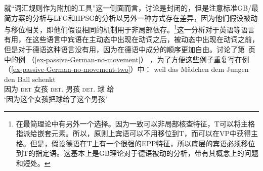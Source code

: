 就“词汇规则作为附加的工具”这一侧面而言，讨论是封闭的，但是注意标准GB/最简方案的分析与LFG和HPSG的分析以另外一种方式存在差异，因为他们假设被动与移位相关，即他们假设相同的机制用于非局部依存。\footnote{%
在最简理论中有另外一个选择。因为一致可以非局部核查特征，T可以将主格指派给嵌套元素。所以，原则上宾语可以不用移位到T，而可以在VP中获得主格。但是，\citet[]{Adger2003a}假设德语在T上有一个很强的EPP特征，所以底层的宾语必须移位到T的指定语。这基本上是GB理论对于德语被动的分析，带有其概念上的问题和短处。  
}这一分析对于英语等语言有用，在这些语言中宾语在主动态中出现在动词之后，被动态中出现在动词之前，但是对于德语这种语言没有用，因为在德语中成分的顺序更加自由。\citet[\S~4.4.3]{Lenerz77}讨论了第~\pageref{ex-passive-German-no-movement}页中的例 （\ref{ex-passive-German-no-movement}） ，为了方便这些例子重复写在例（\ref{ex-passive-German-no-movement-two}）中：
\eal
\label{ex-passive-German-no-movement-two}
\ex 
\gll weil das Mädchen dem Jungen den Ball schenkt\\
     因为 \textsc{det} 女孩 \textsc{det}.\dat{} 男孩 \textsc{det}.\acc{} 球 给\\
\glt `因为这个女孩把球给了这个男孩'

